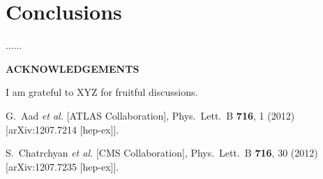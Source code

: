 \documentclass[10pt]{article}
\def\Acknowledgements{\bigskip  \bigskip \begin{center} \begin{large}
             \bf ACKNOWLEDGEMENTS \end{large}\end{center}}
\begin{document}


\section{Conclusions}

...... 

\Acknowledgements
I am grateful to XYZ for fruitful discussions.


\begin{thebibliography}{99}


  G.~Aad {\it et al.}  [ATLAS Collaboration],
  Phys.\ Lett.\ B {\bf 716}, 1 (2012)
  [arXiv:1207.7214 [hep-ex]].
  
  
  S.~Chatrchyan {\it et al.}  [CMS Collaboration],
  Phys.\ Lett.\ B {\bf 716}, 30 (2012)
  [arXiv:1207.7235 [hep-ex]].



\end{thebibliography}

 
\end{document}
